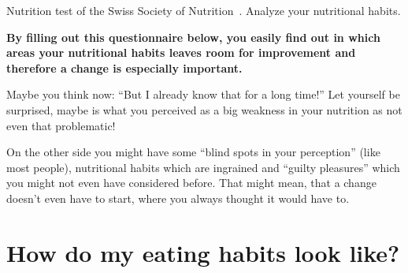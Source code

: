 \documentclass[../main.tex]{subfiles}
\begin{document}
Nutrition test of the Swiss Society of Nutrition~\cite{SGE}. Analyze your nutritional habits.

\vspace{5mm}

\textbf{By filling out this questionnaire below, you easily find out in which areas your nutritional habits leaves room for improvement
  and therefore a change is especially important.}

\vspace{5mm}

Maybe you think now: ``But I already know that for a long time!''
Let yourself be surprised, maybe is what you perceived as a big weakness in your nutrition as not even that problematic!

On the other side you might have some ``blind spots in your perception'' (like most people),
nutritional habits which are ingrained and ``guilty pleasures'' which you might not even have considered before.
That might mean, that a change doesn't even have to start, where you always thought it would have to.

\vspace{5mm}

\section{How do my eating habits look like?}

\vspace{5mm}
\end{document}
